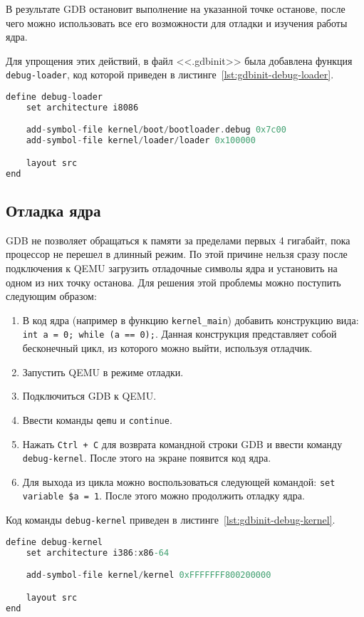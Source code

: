 В результате GDB остановит выполнение на
указанной точке останове, после чего можно использовать все его возможности для отладки и изучения работы ядра.

Для упрощения этих действий, в файл <<.gdbinit>> была добавлена функция \texttt{debug-loader}, код
которой приведен в листинге~\ref{lst:gdbinit-debug-loader}.

\begin{lstlisting}[language=C, caption={Реализация команды <<debug-loader>>}, label={lst:gdbinit-debug-loader}]
define debug-loader
	set architecture i8086

	add-symbol-file kernel/boot/bootloader.debug 0x7c00
	add-symbol-file kernel/loader/loader 0x100000

	layout src
end
\end{lstlisting}

\subsection{Отладка ядра}
GDB не позволяет обращаться к памяти за пределами первых 4 гигабайт, пока процессор не перешел в длинный
режим. По этой причине нельзя сразу после подключения к QEMU загрузить отладочные символы ядра и установить
на одном из них точку останова. Для решения этой проблемы можно поступить следующим образом:
\begin{enumerate}[1.]
	\item В код ядра (например в функцию \texttt{kernel\_main}) добавить конструкцию вида:
		\texttt{int a = 0; while (a == 0);}. Данная конструкция представляет собой
		бесконечный цикл, из которого можно выйти, используя отладчик.
	\item Запустить QEMU в режиме отладки.
	\item Подключиться GDB к QEMU.
	\item Ввести команды \texttt{qemu} и \texttt{continue}.
	\item Нажать \texttt{Ctrl + C} для возврата командной строки GDB и ввести команду \texttt{debug-kernel}.
		После этого на экране появится код ядра.
	\item Для выхода из цикла можно воспользоваться следующей командой: \texttt{set variable \$a = 1}.
		После этого можно продолжить отладку ядра.
\end{enumerate}

Код команды \texttt{debug-kernel} приведен в листинге~\ref{lst:gdbinit-debug-kernel}.
\begin{lstlisting}[language=C, caption={Реализация команды <<debug-kernel>>}, label={lst:gdbinit-debug-kernel}]
define debug-kernel
	set architecture i386:x86-64

	add-symbol-file kernel/kernel 0xFFFFFFF800200000

	layout src
end
\end{lstlisting}

